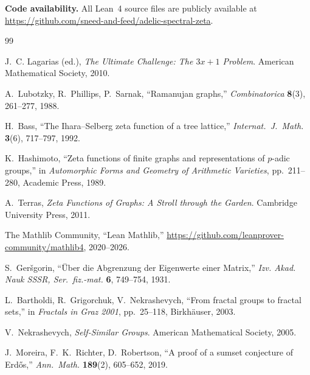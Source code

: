 \documentclass[12pt]{article}
\begin{document}
\vspace{1em}
\noindent\textbf{Code availability.}
All Lean~4 source files are publicly available at\\
\url{https://github.com/sneed-and-feed/adelic-spectral-zeta}.


\begin{thebibliography}{99}

J.~C. Lagarias (ed.),
\textit{The Ultimate Challenge: The $3x+1$ Problem}.
American Mathematical Society, 2010.

A.~Lubotzky, R.~Phillips, P.~Sarnak,
``Ramanujan graphs,''
\textit{Combinatorica} \textbf{8}(3), 261--277, 1988.

H.~Bass,
``The Ihara--Selberg zeta function of a tree lattice,''
\textit{Internat.\ J.\ Math.} \textbf{3}(6), 717--797, 1992.

K.~Hashimoto,
``Zeta functions of finite graphs and representations of $p$-adic groups,''
in \textit{Automorphic Forms and Geometry of Arithmetic Varieties},
pp.\ 211--280, Academic Press, 1989.

A.~Terras,
\textit{Zeta Functions of Graphs: A Stroll through the Garden}.
Cambridge University Press, 2011.

The Mathlib Community,
``Lean Mathlib,''
\url{https://github.com/leanprover-community/mathlib4}, 2020--2026.

S.~Ger{\v s}gorin,
``\"{U}ber die Abgrenzung der Eigenwerte einer Matrix,''
\textit{Izv. Akad. Nauk SSSR, Ser.\ fiz.-mat.} \textbf{6}, 749--754, 1931.

L.~Bartholdi, R.~Grigorchuk, V.~Nekrashevych,
``From fractal groups to fractal sets,''
in \textit{Fractals in Graz 2001}, pp.\ 25--118, Birkh\"{a}user, 2003.

V.~Nekrashevych,
\textit{Self-Similar Groups}.
American Mathematical Society, 2005.

J.~Moreira, F.~K.\ Richter, D.~Robertson,
``A proof of a sumset conjecture of Erd\H{o}s,''
\textit{Ann.\ Math.} \textbf{189}(2), 605--652, 2019.

\end{thebibliography}
\end{document}
